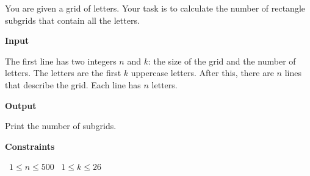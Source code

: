 You are given a grid of letters. Your task is to calculate the number of rectangle subgrids that contain all the letters.

\vspace{0.3cm}\noindent\textbf{Input}

The first line has two integers $n$ and $k$: the size of the grid and the number of letters. The letters are the first $k$ uppercase letters.
After this, there are $n$ lines that describe the grid. Each line has $n$ letters.

\vspace{0.3cm}\noindent\textbf{Output}

Print the number of subgrids.

\vspace{0.3cm}\noindent\textbf{Constraints}

\textbullet\ $1 \le n \le 500$
\textbullet\ $1 \le k \le 26$